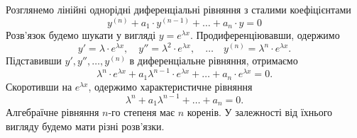 Розглянемо лінійні однорідні диференціальні рівняння з сталими коефіцієнтами
\begin{equation*}
	y^{(n)} + a_1 \cdot y^{(n - 1)} + \ldots + a_n \cdot y = 0
\end{equation*}
Розв'язок будемо шукати у вигляді $y = e^{\lambda x}$. Продиференціювавши, одержимо 
\begin{equation*}
 	y' = \lambda \cdot e^{\lambda x}, \quad y'' = \lambda^2 \cdot e^{\lambda x}, \quad \ldots \quad y^{(n)} = \lambda^n \cdot e^{\lambda x}.
\end{equation*}
Підставивши $y', y'', \ldots, y^{(n)}$ в диференціальне рівняння, отримаємо
\begin{equation*}
	\lambda^n \cdot e^{\lambda x} + a_1 \lambda^{n - 1}\cdot e^{\lambda x} + \ldots + a_n \cdot e^{\lambda x} = 0.
\end{equation*}
Скоротивши на $e^{\lambda x}$, одержимо характеристичне рівняння
\begin{equation*}
	\lambda^n + a_1 \lambda^{n - 1} + \ldots + a_n = 0.
\end{equation*}
Алгебраїчне рівняння $n$-го степеня має $n$ коренів. У залежності від їхнього вигляду будемо мати різні розв'язки.
